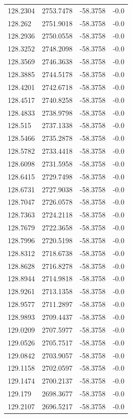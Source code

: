 \begin{table}[H]
\begin{tabular}{llll}
128.2304 & 2753.7478 & -58.3758 & -0.0 \\
128.262 & 2751.9018 & -58.3758 & -0.0 \\
128.2936 & 2750.0558 & -58.3758 & -0.0 \\
128.3252 & 2748.2098 & -58.3758 & -0.0 \\
128.3569 & 2746.3638 & -58.3758 & -0.0 \\
128.3885 & 2744.5178 & -58.3758 & -0.0 \\
128.4201 & 2742.6718 & -58.3758 & -0.0 \\
128.4517 & 2740.8258 & -58.3758 & -0.0 \\
128.4833 & 2738.9798 & -58.3758 & -0.0 \\
128.515 & 2737.1338 & -58.3758 & -0.0 \\
128.5466 & 2735.2878 & -58.3758 & -0.0 \\
128.5782 & 2733.4418 & -58.3758 & -0.0 \\
128.6098 & 2731.5958 & -58.3758 & -0.0 \\
128.6415 & 2729.7498 & -58.3758 & -0.0 \\
128.6731 & 2727.9038 & -58.3758 & -0.0 \\
128.7047 & 2726.0578 & -58.3758 & -0.0 \\
128.7363 & 2724.2118 & -58.3758 & -0.0 \\
128.7679 & 2722.3658 & -58.3758 & -0.0 \\
128.7996 & 2720.5198 & -58.3758 & -0.0 \\
128.8312 & 2718.6738 & -58.3758 & -0.0 \\
128.8628 & 2716.8278 & -58.3758 & -0.0 \\
128.8944 & 2714.9818 & -58.3758 & -0.0 \\
128.9261 & 2713.1358 & -58.3758 & -0.0 \\
128.9577 & 2711.2897 & -58.3758 & -0.0 \\
128.9893 & 2709.4437 & -58.3758 & -0.0 \\
129.0209 & 2707.5977 & -58.3758 & -0.0 \\
129.0526 & 2705.7517 & -58.3758 & -0.0 \\
129.0842 & 2703.9057 & -58.3758 & -0.0 \\
129.1158 & 2702.0597 & -58.3758 & -0.0 \\
129.1474 & 2700.2137 & -58.3758 & -0.0 \\
129.179 & 2698.3677 & -58.3758 & -0.0 \\
129.2107 & 2696.5217 & -58.3758 & -0.0 \\

\end{tabular}
\end{table}
